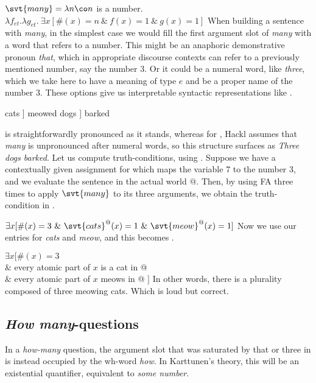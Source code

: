 \ex $\svt{many} = \lambda n\co n$ is a number.
$\lambda f_{et}.\lambda g_{et}.\ \exists x [\#(x)=n\ \&\ f(x)=1\ \&\ g(x)=1]$
\xe
%
When building a sentence with \emph{many}, in the simplest case we would fill
the first argument slot of \emph{many} with a word that refers to a number. This
might be an anaphoric demonstrative pronoun \emph{that}, which in appropriate
discourse contexts can refer to a previously mentioned number, say the number 3.
Or it could be a numeral word, like \emph{three}, which we take here to have a
meaning of type $e$ and be a proper name of the number 3. These options give us
interpretable syntactic representations like \Next[a,b].

\pex\label{ex:that-three}
\a\null [ [ that$_{7}$ many ] cats ] meowed
\a\null [ [ three many ] dogs ] barked
\xe

\Last[a] is straightforwardly pronounced as it stands, whereas for \Last[b],
Hackl assumes that \emph{many} is unpronounced after numeral words, so this
structure surfaces as \emph{Three dogs barked}. Let us compute truth-conditions,
using \LLast. Suppose we have a contextually given assignment for \Last[a] which
maps the variable 7 to the number 3, and we evaluate the sentence in the actual
world $@$. Then, by using FA three times to apply $\svt{many}$ to its three
arguments, we obtain the truth-condition in \Next.

\ex $\exists x [\#(x)=3\ \&\ \svt{cats}^{@}(x)=1\ \&\ \svt{meow}^{@}(x)=1]$ \xe
%
Now we use our entries for \emph{cats} and \emph{meow}, and this becomes \Next.

\ex $\exists x [ \#(x) = 3$\\
$\&$ every atomic part of $x$ is a cat in @\\
$\&$ every atomic part of $x$ meows in @ $]$
\xe
%
In other words, there is a plurality composed of three meowing cats. Which is
loud but correct.

\clearpage
\subsection{\emph{How many}-questions}
\label{sec:how-many-qs}

%
In a \emph{how-many} question, the argument slot that was saturated by that or
three in  is instead occupied by the wh-word \emph{how}. In
Karttunen’s theory, this will be an existential quantifier, equivalent to
\emph{some number}.

